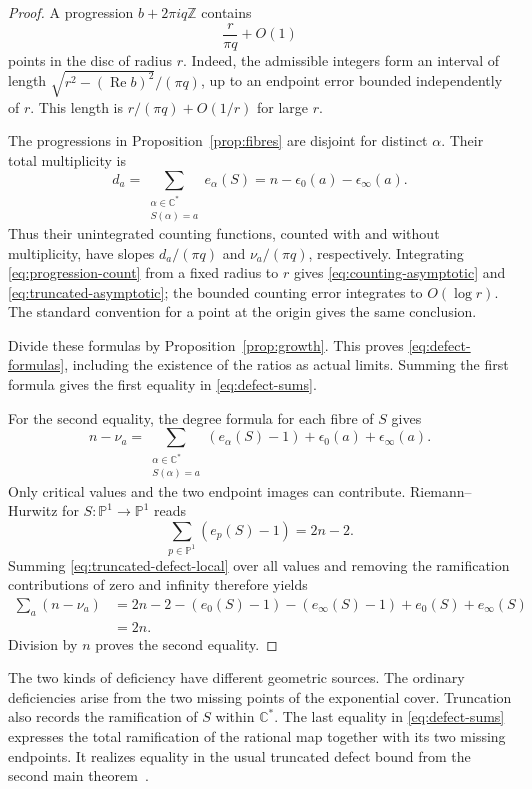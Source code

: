 \documentclass[11pt,reqno]{amsart}
\numberwithin{equation}{section}
\theoremstyle{definition}
\theoremstyle{remark}
\newcommand{\C}{\mathbb C}
\newcommand{\Z}{\mathbb Z}
\newcommand{\PP}{\mathbb P}
\begin{document}
\begin{proof}
A progression $b+2\pi iq\Z$ contains
\begin{equation}
 \frac{r}{\pi q}+O(1)
 \label{eq:progression-count}
\end{equation}
points in the disc of radius $r$. Indeed, the admissible integers
form an interval of length
$\sqrt{r^2-(\operatorname{Re}b)^2}/(\pi q)$, up to an endpoint
error bounded independently of $r$. This length is
$r/(\pi q)+O(1/r)$ for large $r$.

The progressions in Proposition~\ref{prop:fibres} are disjoint
for distinct $\alpha$. Their total multiplicity is
\[
 d_a=\sum_{\substack{\alpha\in\C^*\\S(\alpha)=a}}
              e_\alpha(S)
     =n-\epsilon_0(a)-\epsilon_\infty(a).
\]
Thus their unintegrated counting functions, counted with and
without multiplicity, have slopes $d_a/(\pi q)$ and
$\nu_a/(\pi q)$, respectively. Integrating
\eqref{eq:progression-count} from a fixed radius to $r$ gives
\eqref{eq:counting-asymptotic} and
\eqref{eq:truncated-asymptotic}; the bounded counting error
integrates to $O(\log r)$. The standard convention for a point
at the origin gives the same conclusion.

Divide these formulas by Proposition~\ref{prop:growth}. This
proves \eqref{eq:defect-formulas}, including the existence of the
ratios as actual limits. Summing the first formula gives the
first equality in \eqref{eq:defect-sums}.

For the second equality, the degree formula for each fibre of
$S$ gives
\begin{equation}
 n-\nu_a=
 \sum_{\substack{\alpha\in\C^*\\S(\alpha)=a}}
         (e_\alpha(S)-1)
 +\epsilon_0(a)+\epsilon_\infty(a).
 \label{eq:truncated-defect-local}
\end{equation}
Only critical values and the two endpoint images can contribute.
Riemann--Hurwitz for $S:\PP^1\to\PP^1$ reads
\[
 \sum_{p\in\PP^1}(e_p(S)-1)=2n-2.
\]
Summing \eqref{eq:truncated-defect-local} over all values and
removing the ramification contributions of zero and infinity
therefore yields
\begin{align*}
 \sum_a(n-\nu_a)
 &=2n-2-(e_0(S)-1)-(e_\infty(S)-1)
                  +e_0(S)+e_\infty(S)\\
 &=2n.
\end{align*}
Division by $n$ proves the second equality.
\end{proof}

The two kinds of deficiency have different geometric sources.
The ordinary deficiencies arise from the two missing points of
the exponential cover. Truncation also records the ramification
of $S$ within $\C^*$. The last equality in
\eqref{eq:defect-sums} expresses the total ramification of
the rational map together with its two missing endpoints. It
realizes equality in the usual truncated defect bound from the
second main theorem~\cite{Hayman1964,Laine1993}.
\end{document}
